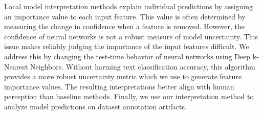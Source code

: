 Local model interpretation methods explain individual predictions by
assigning an importance value to each input feature. This value is
often determined by measuring the change in 
confidence when a feature is removed. However, the confidence of neural networks 
is not a robust measure of model uncertainty. This issue makes 
reliably judging the importance of the input features difficult. 
We address this by changing the test-time behavior of neural networks
using Deep k-Nearest Neighbors. Without harming text classification accuracy, 
this algorithm provides a more robust uncertainty
metric which we use to generate feature importance values.
The resulting interpretations better align with human perception than
baseline methods. Finally, we use our interpretation method
to analyze model predictions on
dataset annotation artifacts.